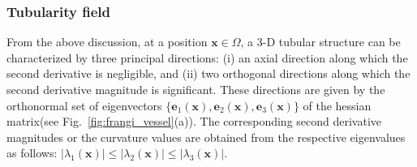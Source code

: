 \subsubsection{Tubularity field}
From the above discussion, at a position $\textbf{x}\in \Omega$, a 3-D tubular structure can be characterized by three principal directions:
(i) an axial direction along which the second derivative is negligible, and (ii) two orthogonal directions along which the second derivative magnitude is significant. These directions are given by the orthonormal set of eigenvectors $\{\textbf{e}_1\left(\textbf{x}\right),\textbf{e}_2\left(\textbf{x}\right),\textbf{e}_3\left(\textbf{x}\right)\}$ of the hessian matrix(see Fig.~\ref{fig:frangi_vessel}(a)). The corresponding second derivative magnitudes or the curvature values are obtained from the respective eigenvalues as follows: $|\lambda_1(\textbf{x})|\leq{|\lambda_2(\textbf{x})|\leq{|\lambda_3(\textbf{x})|}}$.
